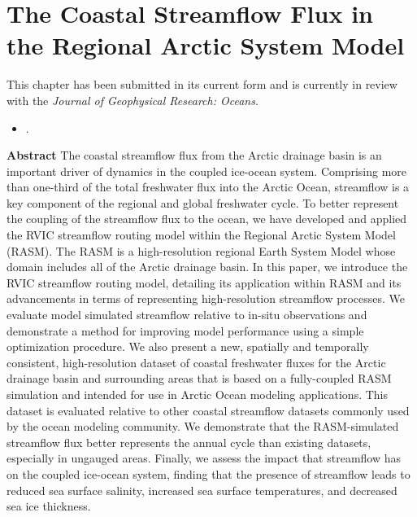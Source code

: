 
\chapter{The Coastal Streamflow Flux in the Regional Arctic System Model}
\label{chap:streamflow}

This chapter has been submitted in its current form and is currently in review with the \textit{Journal of Geophysical Research: Oceans}.

\begin{itemize}
    \item {}.
\end{itemize}

{\bf Abstract}
The coastal streamflow flux from the Arctic drainage basin is an important driver of dynamics in the coupled ice-ocean system.
Comprising more than one-third of the total freshwater flux into the Arctic Ocean, streamflow is a key component of the regional and global freshwater cycle.
To better represent the coupling of the streamflow flux to the ocean, we have developed and applied the RVIC streamflow routing model within the Regional Arctic System Model (RASM).
The RASM is a high-resolution regional Earth System Model whose domain includes all of the Arctic drainage basin.
In this paper, we introduce the RVIC streamflow routing model, detailing its application within RASM and its advancements in terms of representing high-resolution streamflow processes.
We evaluate model simulated streamflow relative to in-situ observations and demonstrate a method for improving model performance using a simple optimization procedure.
We also present a new, spatially and temporally consistent, high-resolution dataset of coastal freshwater fluxes for the Arctic drainage basin and surrounding areas that is based on a fully-coupled RASM simulation and intended for use in Arctic Ocean modeling applications.
This dataset is evaluated relative to other coastal streamflow datasets commonly used by the ocean modeling community.
We demonstrate that the RASM-simulated streamflow flux better represents the annual cycle than existing datasets, especially in ungauged areas.
Finally, we assess the impact that streamflow has on the coupled ice-ocean system, finding that the presence of streamflow leads to reduced sea surface salinity, increased sea surface temperatures, and decreased sea ice thickness.

